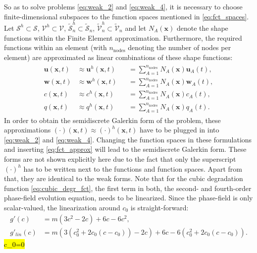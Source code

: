 So as to solve problems \eqref{eq:weak_2} and \eqref{eq:weak_4}, it is necessary to choose finite-dimensional subspaces to the function spaces mentioned in \eqref{eq:fct_spaces}. Let $\bm{\mathcal{S}}^{h}\subset\bm{\mathcal{S}}$, $\bm{\mathcal{V}}^{h}\subset\bm{\mathcal{V}}$, $\tilde{\mathcal{S}}_{n}^{h}\subset\tilde{\mathcal{S}}_{n}$, $\tilde{\mathcal{V}}_{n}^{h}\subset\tilde{\mathcal{V}}_{n}$ and let $N_{A}\left(\mathbf{x}\right)$ denote the shape functions within the Finite Element approximation. Furthermore, the required functions within an element (with $n_{\text{nodes}}$ denoting the number of nodes per element) are approximated as linear combinations of these shape functions:
\begin{equation} \label{eq:fct_approx}
	\begin{aligned}
	\begin{alignedat}{2}
		\mathbf{u}\left(\mathbf{x},t\right) &\approx \mathbf{u}^{h}\left(\mathbf{x},t\right) &&= \sum\limits_{A=1}^{n_{\text{nodes}}}N_{A}\left(\mathbf{x}\right)\mathbf{u}_{A}\left(t\right), \\
		\mathbf{w}\left(\mathbf{x},t\right) &\approx \mathbf{w}^{h}\left(\mathbf{x},t\right) &&= \sum\limits_{A=1}^{n_{\text{nodes}}}N_{A}\left(\mathbf{x}\right)\mathbf{w}_{A}\left(t\right), \\
		c\left(\mathbf{x},t\right) &\approx c^{h}\left(\mathbf{x},t\right) &&= \sum\limits_{A=1}^{n_{\text{nodes}}}N_{A}\left(\mathbf{x}\right)c_{A}\left(t\right), \\
		q\left(\mathbf{x},t\right) &\approx q^{h}\left(\mathbf{x},t\right) &&= \sum\limits_{A=1}^{n_{\text{nodes}}}N_{A}\left(\mathbf{x}\right)q_{A}\left(t\right).
	\end{alignedat}
	\end{aligned}
\end{equation}
In order to obtain the semidiscrete Galerkin form of the problem, these approximations $\left(\cdot\right)\left(\mathbf{x},t\right)\approx\left(\cdot\right)^{h}\left(\mathbf{x},t\right)$ have to be plugged in into \eqref{eq:weak_2} and \eqref{eq:weak_4}. Changing the function spaces in these formulations and inserting \eqref{eq:fct_approx} will lead to the semidiscrete Galerkin form. These forms are not shown explicitly here due to the fact that only the superscript $\left(\cdot\right)^{h}$ has to be written next to the functions and function spaces. Apart from that, they are identical to the weak forms. Note that for the cubic degradation function \eqref{eq:cubic_degr_fct}, the first term in both, the second- and fourth-order phase-field evolution equation, needs to be linearized. Since the phase-field is only scalar-valued, the linearization around $c_{0}$ is straight-forward:
\begin{equation} \label{eq:cubic_degr_fct_lin}	
	\begin{aligned}
		g'\left(c\right) &= m\left(3c^{2}-2c\right)+6c-6c^{2}, \\
		g'_{lin}\left(c\right) &= m\left(3\left(c_{0}^{2}+2c_{0}\left(c-c_{0}\right)\right)-2c\right)+6c-6\left(c_{0}^{2}+2c_{0}\left(c-c_{0}\right)\right).
	\end{aligned}
\end{equation}
\hl{c_{0}=0}

